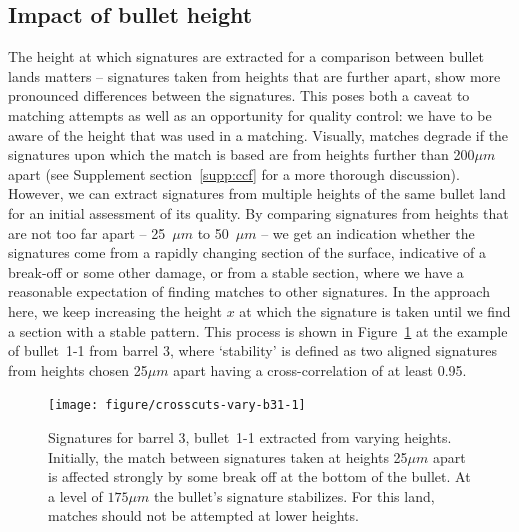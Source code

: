 \documentclass[aoas, preprint]{imsart}\usepackage[]{graphicx}\usepackage[]{color}
\newenvironment{knitrout}{}{} %
\begin{document}
\subsection{Impact of bullet height}\label{sec:heights}
The height at which signatures are extracted for a comparison between bullet lands matters -- signatures taken from heights that are further apart, show more pronounced differences between the signatures. 
This poses both a caveat to matching attempts as well as an opportunity for quality control: we have to be aware of the height that was used in a matching. Visually, matches degrade if the signatures upon which the match is based are from heights further than 200$\mu m$ apart  (see Supplement section~\ref{supp:ccf} for a more thorough discussion). However, we can extract signatures from multiple heights of the same bullet land for an initial assessment of its quality. By comparing signatures from heights that are not too far apart --  25~$\mu m$ to 50~$\mu m$ -- we get an indication whether the signatures come from a rapidly changing section of the surface, indicative of a break-off or some other damage, or from a stable section, where we have a reasonable expectation of finding matches to other signatures. In the approach here, we keep increasing the height $x$ at which the signature is taken until we find a section with a stable pattern. This process is shown in Figure~\ref{fig:crosscuts2} at the example of bullet~1-1 from barrel 3, where `stability' is  defined as two aligned signatures from heights chosen 25$\mu m$ apart having a cross-correlation of at least 0.95. 

\begin{figure}[hbtp]
  \centering
\begin{knitrout}
\color{fgcolor}
\texttt{[image: figure/crosscuts-vary-b31-1]} 

\end{knitrout}
\caption{\label{fig:crosscuts2}Signatures  for barrel 3, bullet~1-1 extracted from varying heights. Initially, the match between signatures taken at heights 25$\mu m$ apart is affected strongly by some break off at the bottom of the bullet. At a  level of $175\mu m$ the bullet's signature stabilizes. For this land, matches should not be attempted at lower heights. }
\end{figure}
\end{document}
